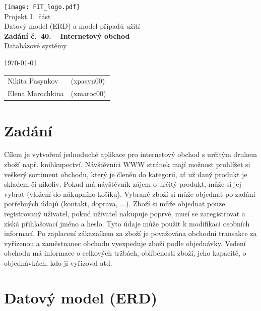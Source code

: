 \documentclass[12pt, a4paper]{article}
\begin{document}
\begin{titlepage}
\begin{center}
    \texttt{[image: FIT\_logo.pdf]} \\
    \Huge{Projekt 1.~část} \\
    \Huge{Datový model (ERD) a model případů užití} \\
    \Large{\textbf{Zadání č.~40.\,--\, Internetový obchod}} \\
    \Large{Databázové systémy}
\end{center}

{\Large
    \today
    \hfill
    \begin{tabular}{l l}
		Nikita Pasynkov & (xpasyn00) \\
		Elena Marochkina & (xmaroc00) \\
    \end{tabular}
}
\end{titlepage}

\setcounter{page}{1}
\tableofcontents
\clearpage

\setcounter{page}{1}

\section{Zadání}
Cílem je vytvoření jednoduché aplikace pro internetový obchod s určitým druhem zboží např. knihkupectví. Návštěvníci WWW stránek mají možnost prohlížet si veškerý sortiment obchodu, který je členěn do kategorií, ať už daný produkt je skladem či nikoliv. Pokud má návštěvník zájem o určitý produkt, může si jej vybrat (vložení do nákupního košíku). Vybrané zboží si může objednat po zadání potřebných údajů (kontakt, doprava, ...). Zboží si může objednat pouze registrovaný uživatel, pokud uživatel nakupuje poprvé, musí se zaregistrovat a získá přihlašovací jméno a heslo. Tyto údaje může použit k modifikaci osobních informací. Po zaplacení zákazníkem za zboží je považována obchodní transakce za vyřízenou a zaměstnanec obchodu vyexpeduje zboží podle objednávky. Vedení obchodu má informace o celkových tržbách, oblíbenosti zboží, jeho kapacitě, o objednávkách, kdo ji vyřizoval atd.
\newpage

\section{Datový model (ERD)}
\end{document}
